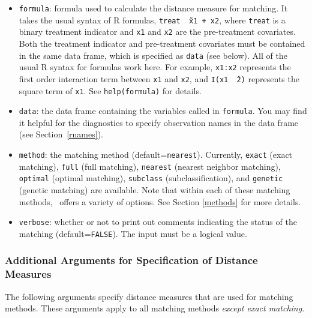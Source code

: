 \begin{itemize}

\item \texttt{formula}: formula used to calculate the distance measure
  for matching.  It takes the usual syntax of R formulas, {\tt treat
    \~\ x1 + x2}, where {\tt treat} is a binary treatment indicator
  and {\tt x1} and {\tt x2} are the pre-treatment covariates. Both the
  treatment indicator and pre-treatment covariates must be contained
  in the same data frame, which is specified as {\tt data} (see
  below).  All of the usual R syntax for formulas work here. For
  example, {\tt x1:x2} represents the first order interaction term
  between {\tt x1} and {\tt x2}, and {\tt I(x1 \^\ 2)} represents the
  square term of {\tt x1}. See {\tt help(formula)} for details.
  
\item \texttt{data}: the data frame containing the variables called in
  {\tt formula}.  You may find it helpful for the diagnostics to
  specify observation names in the data frame (see
  Section~\ref{rnames}).
  
\item \texttt{method}: the matching method (default=\texttt{nearest}).
  Currently, \texttt{exact} (exact matching), \texttt{full} (full
  matching), \texttt{nearest} (nearest neighbor matching),
  \texttt{optimal} (optimal matching), \texttt{subclass}
  (subclassification), and \texttt{genetic} (genetic matching) are
  available. Note that within each of these matching methods,
  \MatchIt\ offers a variety of options.  See Section \ref{methods}
  for more details.

\item \texttt{verbose}: whether or not to print out comments
  indicating the status of the matching (default=\texttt{FALSE}). The
  input must be a logical value.  
\end{itemize}


\subsubsection{Additional Arguments for Specification of
  Distance Measures}
\label{subsubsec:inputs-all}

The following arguments specify distance measures that are used for
matching methods. These arguments apply to all matching methods {\it
  except exact matching}.

